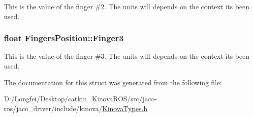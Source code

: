 This is the value of the finger \#2. The units will depends on the context it\textquotesingle{}s been used. 

\subsubsection[{\texorpdfstring{Finger3}{Finger3}}]{\setlength{\rightskip}{0pt plus 5cm}float Fingers\+Position\+::\+Finger3}\hypertarget{structFingersPosition_a03c819e4c20367e36e62a864bf829160}{}\label{structFingersPosition_a03c819e4c20367e36e62a864bf829160}


This is the value of the finger \#3. The units will depends on the context it\textquotesingle{}s been used. 



The documentation for this struct was generated from the following file\+:\begin{DoxyCompactItemize}
\item 
D\+:/\+Longfei/\+Desktop/catkin\+\_\+\+Kinova\+R\+O\+S/src/jaco-\/ros/jaco\+\_\+driver/include/kinova/\hyperlink{KinovaTypes_8h}{Kinova\+Types.\+h}\end{DoxyCompactItemize}
